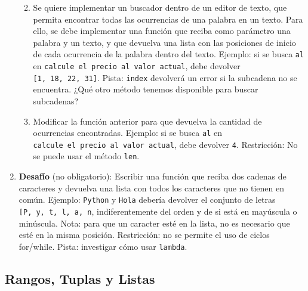 \documentclass[
  letterpaper,
  DIV=11,
  numbers=noendperiod]{scrreprt}
\begin{document}
\begin{enumerate}
  \begin{enumerate}
  \def\labelenumii{\alph{enumii}.}
  \item
    Se quiere implementar un buscador dentro de un editor de texto, que
    permita encontrar todas las ocurrencias de una palabra en un texto.
    Para ello, se debe implementar una función que reciba como parámetro
    una palabra y un texto, y que devuelva una lista con las posiciones
    de inicio de cada ocurrencia de la palabra dentro del texto.
    Ejemplo: si se busca \texttt{\textquotesingle{}al\textquotesingle{}}
    en
    \texttt{\textquotesingle{}calcule\ el\ precio\ al\ valor\ actual\textquotesingle{}},
    debe devolver \texttt{{[}1,\ 18,\ 22,\ 31{]}}. Pista: \texttt{index}
    devolverá un error si la subcadena no se encuentra. ¿Qué otro método
    tenemos disponible para buscar subcadenas?
  \item
    Modificar la función anterior para que devuelva la cantidad de
    ocurrencias encontradas. Ejemplo: si se busca
    \texttt{\textquotesingle{}al\textquotesingle{}} en
    \texttt{\textquotesingle{}calcule\ el\ precio\ al\ valor\ actual\textquotesingle{}},
    debe devolver \texttt{4}. Restricción: No se puede usar el método
    \texttt{len}.
  \end{enumerate}
\item
  \textbf{Desafío} (no obligatorio): Escribir una función que reciba dos
  cadenas de caracteres y devuelva una lista con todos los caracteres
  que no tienen en común. Ejemplo:
  \texttt{\textquotesingle{}Python\textquotesingle{}} y
  \texttt{\textquotesingle{}Hola\textquotesingle{}} debería devolver el
  conjunto de letras
  \texttt{{[}\textquotesingle{}P\textquotesingle{},\ \textquotesingle{}y\textquotesingle{},\ \textquotesingle{}t\textquotesingle{},\ \textquotesingle{}l\textquotesingle{},\ \textquotesingle{}a\textquotesingle{},\ \textquotesingle{}n\textquotesingle{}{]}},
  indiferentemente del orden y de si está en mayúscula o minúscula.
  Nota: para que un caracter esté en la lista, no es necesario que esté
  en la misma posición. Restricción: no se permite el uso de ciclos
  for/while. Pista: investigar cómo usar \texttt{lambda}.
\end{enumerate}

\hypertarget{rangos-tuplas-y-listas}{%
\subsection*{Rangos, Tuplas y Listas}\label{rangos-tuplas-y-listas}}
\end{document}
